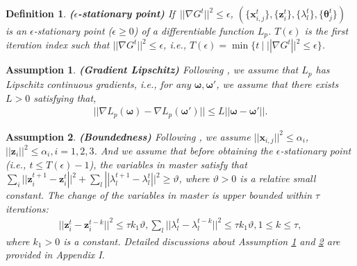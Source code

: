 \documentclass[letterpaper]{article} %
\newtheorem{definition}{Definition}
\newtheorem{assumption}{Assumption}
\begin{document}
\begin{definition}
\label{definition:e stationary point}
{\textbf{($\epsilon$-stationary point)}} If $\,||\nabla G^t||^2 \le \epsilon $,  $(\{{\boldsymbol{x}_{i,j}^t}\} ,\! \{{\boldsymbol{z}_i^t}\},\! \{\lambda_l^t\}, \!\{\boldsymbol{\theta}_j^t\} )$ is an $\epsilon$-stationary point ($\epsilon  \ge 0$) of a differentiable function ${L_p}$.  $T(\epsilon )$ is the first iteration index such that $||\nabla G^t||^2   \le  \epsilon$, \textit{i.e.}, $T(\epsilon )  =  \min \{ t \ |\; ||\nabla G^t||^2   \le  \epsilon \}  $.
\end{definition}


\begin{assumption}\label{assumption:1}
\textbf{{{(Gradient Lipschitz})}} Following \cite{ji2021bilevel}, we assume that
$L_p$ has Lipschitz continuous gradients, i.e., for any $\boldsymbol{\omega}, \boldsymbol{\omega}'$, we assume that there exists $L>0$ satisfying that,
\begin{equation}
    \begin{array}{l}
||{\nabla}{L_p}(\boldsymbol{\omega})  -  {\nabla}{L_p}(\boldsymbol{\omega}')|| \le L||\boldsymbol{\omega}-\boldsymbol{\omega}'||.
\end{array}
\end{equation}
\end{assumption}


\begin{assumption}\label{assumption:2}
{\textbf{(Boundedness)}} Following \cite{qian2019robust,jiao2022asynchronous}, we assume $||\boldsymbol{x}_{i,j}||^2\!\le\!\alpha_i$, $||\boldsymbol{z}_i||^2\!\le\!\alpha_i,i=1,2,3$. And we assume that before obtaining the $\epsilon$-stationary point (i.e., $t\!\le\! T(\epsilon )\!-\!1$), the variables in master satisfy that $\sum\nolimits_i||\boldsymbol{z}_i^{t+1} \!-\! \boldsymbol{z}_i^t|{|^2}\!+\!\sum\nolimits_l||{\lambda _l^{t + 1}} \!-\! {\lambda _l^t}|{|^2} \ge \vartheta $, where $\vartheta >0$ is a relative small constant. The change of the variables in master is upper bounded within $\tau$ iterations:
\begin{equation}
\begin{array}{*{20}{l}}
\!{\!||\boldsymbol{z}_i^t \!-\! \boldsymbol{z}_i^{t - k}|{|^2} \! \le \! \tau{k_1}\vartheta},
{\sum\nolimits_l \! ||{\lambda _l^t} \!-\! {\lambda _l^{t - k}}|{|^2} \! \le \! \tau{k_1}\vartheta}, {1 \! \le \! k \! \le \! \tau },
\end{array}
\end{equation}
where $k_1 >0$ is a constant. Detailed discussions about Assumption \ref{assumption:1} and \ref{assumption:2} are provided in Appendix I.
\end{assumption}
\end{document}
